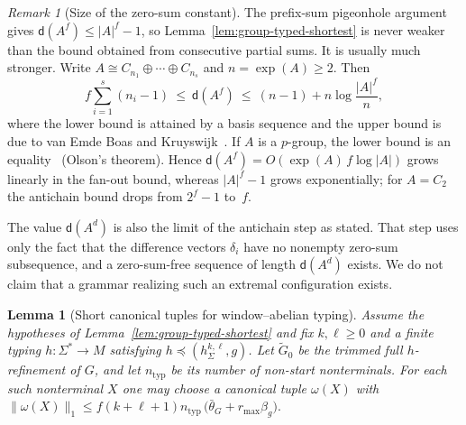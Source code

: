 \documentclass[11pt]{article}
\numberwithin{equation}{section}
\theoremstyle{plain}
\newtheorem{lemma}[theorem]{Lemma}
\theoremstyle{definition}
\theoremstyle{remark}
\newtheorem{remark}[theorem]{Remark}
\theoremstyle{plain}
\begin{document}
\begin{remark}[Size of the zero-sum constant]
\label{rem:davenport-size-v82}
The prefix-sum pigeonhole argument gives
$\mathsf d(A^f)\le|A|^f-1$, so
Lemma~\ref{lem:group-typed-shortest} is never weaker
than the bound obtained from consecutive partial sums.
It is usually much stronger.  Write
$A\cong C_{n_1}\oplus\cdots\oplus C_{n_s}$ and
$n=\exp(A)\ge2$. Then
\[
 f\sum_{i=1}^{s}(n_i-1)\ \le\ \mathsf d(A^f)\ \le\
 (n-1)+n\log\frac{|A|^f}{n},
\]
where the lower bound is attained by a basis
sequence and the upper bound is due to van Emde Boas
and Kruyswijk~\cite[Proposition~5.1.8 and Theorem~5.5.5]{GeroldingerHalterKoch2006}.
If $A$ is a $p$-group, the lower bound is an
equality~\cite[Theorem~5.5.9]{GeroldingerHalterKoch2006}
(Olson's theorem).
Hence $\mathsf d(A^f)=O(\exp(A)\,f\log|A|)$ grows
linearly in the fan-out bound, whereas $|A|^f-1$ grows
exponentially; for $A=C_2$ the antichain bound drops
from $2^f-1$ to~$f$.

The value $\mathsf d(A^d)$ is also the limit of the
antichain step as stated.  That step uses only the
fact that the difference vectors $\delta_i$ have no
nonempty zero-sum subsequence, and a zero-sum-free
sequence of length $\mathsf d(A^d)$ exists.  We do not
claim that a grammar realizing such an extremal
configuration exists.
\end{remark}

\begin{lemma}[Short canonical tuples for window--abelian typing]
\label{lem:window-abelian-short}
Assume the hypotheses of
Lemma~\ref{lem:group-typed-shortest} and fix
$k,\ell\ge0$ and a finite typing
$h:\Sigma^*\to M$ satisfying
$h\preceq(h_\Sigma^{k,\ell},g)$.
Let $\widetilde G_0$ be the trimmed
full $h$-refinement of $G$, and let
$n_{\mathrm{typ}}$ be its number of
non-start nonterminals. For each such
nonterminal $X$ one may choose a
canonical tuple $\omega(X)$ with
\(\|\omega(X)\|_1\le f(k+\ell+1)n_{\mathrm{typ}}\, \bigl(\bar\theta_G+r_{\max}\beta_g\bigr).\)
\end{lemma}
\end{document}
